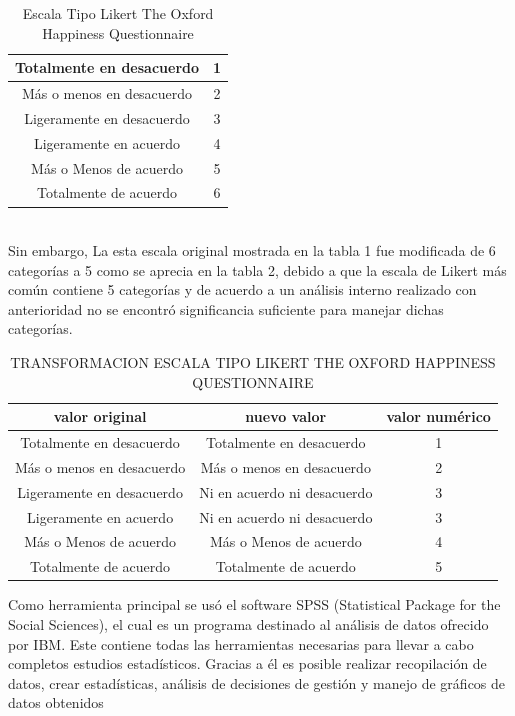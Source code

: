 \documentclass[conference]{IEEEtran}
\begin{document}
\begin{table}[h]
\caption{Escala Tipo Likert The Oxford Happiness Questionnaire}
\label{tabla 1}
\begin{center}
\begin{tabular}{|c||c|}
\hline
Totalmente en desacuerdo & 1\\ \hline
Más o menos en desacuerdo & 2\\ \hline
Ligeramente en desacuerdo & 3\\ \hline
Ligeramente en acuerdo & 4\\ \hline
Más o Menos de acuerdo & 5\\ \hline
Totalmente de acuerdo & 6\\ \hline
\end{tabular}
\end{center}
\end{table}\\
   Sin embargo, La esta escala original mostrada en la tabla 1 fue modificada de 6 categorías a 5 como se aprecia en la tabla 2, debido a que la escala de Likert más común contiene 5 categorías y de acuerdo a un análisis interno realizado con anterioridad no se encontró significancia suficiente para manejar dichas categorías.\\
   
   \begin{table}[h]
\caption{TRANSFORMACION ESCALA TIPO LIKERT THE OXFORD HAPPINESS QUESTIONNAIRE}
\label{tabla 1}
\begin{center}
\resizebox{8.8cm}{!} {
\begin{tabular}{|c||c||c|}
\hline
valor original & nuevo valor & valor numérico \\
\hline \hline \hline
Totalmente en desacuerdo & Totalmente en desacuerdo & 1\\ \hline
Más o menos en desacuerdo & Más o menos en desacuerdo & 2\\ \hline
Ligeramente en desacuerdo & Ni en acuerdo ni desacuerdo & 3\\ \hline
Ligeramente en acuerdo &Ni en acuerdo ni desacuerdo & 3\\ \hline
Más o Menos de acuerdo & Más o Menos de acuerdo & 4\\ \hline
Totalmente de acuerdo & Totalmente de acuerdo & 5\\ \hline
\end{tabular}
}
\end{center}
\end{table}
   Como herramienta principal se usó el software SPSS (Statistical Package for the Social Sciences), el cual es un programa destinado al análisis de datos ofrecido por IBM. Este contiene todas las herramientas necesarias para llevar a cabo completos estudios estadísticos. Gracias a él es posible realizar recopilación de datos, crear estadísticas, análisis de decisiones de gestión y manejo de gráficos de datos obtenidos\\               
\end{document}
